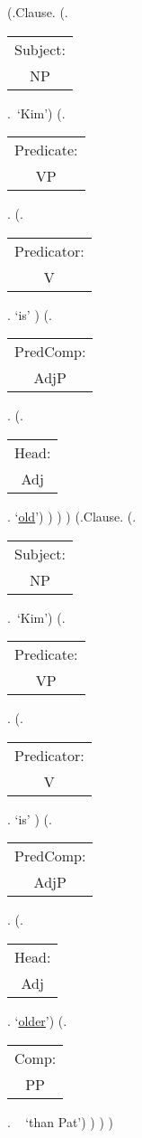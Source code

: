 \documentclass[12pt,letterpaper]{article}
\begin{document}
\begin{figure}
	\begin{center}
		\begin{parsetree}
			(.Clause.
			(.\begin{tabular}{c}Subject:\\NP\end{tabular}.~`Kim')
			(.\begin{tabular}{c}Predicate:\\VP\end{tabular}.
			(.\begin{tabular}{c}Predicator:\\V\end{tabular}. `is' )
			(.\begin{tabular}{c}PredComp:\\AdjP\end{tabular}.  (.\begin{tabular}{c}Head:\\Adj\end{tabular}. `\underline{old}')
			)
			)
			)
			(.Clause.
			(.\begin{tabular}{c}Subject:\\NP\end{tabular}.~`Kim')
			(.\begin{tabular}{c}Predicate:\\VP\end{tabular}.
			(.\begin{tabular}{c}Predicator:\\V\end{tabular}. `is' )
			(.\begin{tabular}{c}PredComp:\\AdjP\end{tabular}.  (.\begin{tabular}{c}Head:\\Adj\end{tabular}. `\underline{older}')
			(.\begin{tabular}{c}Comp:\\PP\end{tabular}. ~ `than Pat')
			)
			)
			)
			

\end{parsetree}
\end{center}
\end{figure}
\end{document}
